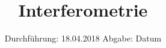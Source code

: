 

\subject{V64}
\title{Interferometrie}
\date{
  Durchführung: 18.04.2018
  \hspace{3em}
  Abgabe: Datum
}



\maketitle
\newpage





%



\printbibliography


